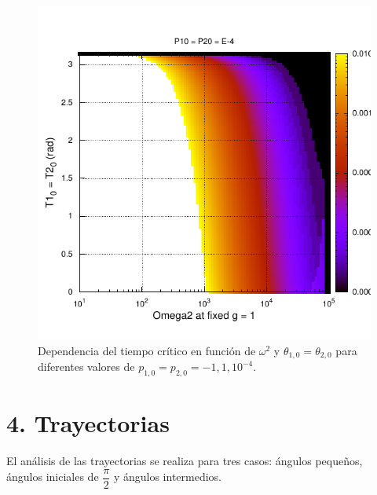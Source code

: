\documentclass[10pt,letterpaper]{article}
\begin{document}
\begin{figure}
\includegraphics[scale=0.8]{PE-4.pdf}
\caption{Dependencia del tiempo crítico en función de $\omega^2$ y $\theta_{1,0} = \theta_{2,0}$ para diferentes valores de $p_{1,0} = p_{2,0} = -1, 1, 10^{-4}$.}\label{Fig-3DPhaseSpace}
\end{figure}
\section*{4. Trayectorias}
El análisis de las trayectorias se realiza para tres casos: ángulos pequeños, ángulos iniciales de $\dfrac{\pi}{2}$ y ángulos intermedios. 
\end{document}

